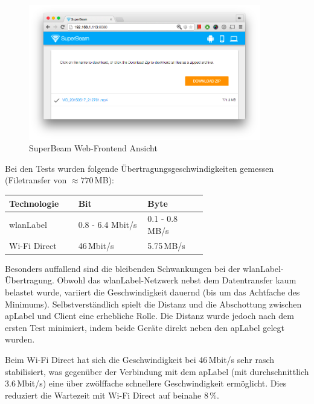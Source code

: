 \begin{figure}[H]
	\centering
	\includegraphics[width=0.9\textwidth]{images/alternatives/superbeam_web.png}
	\caption{SuperBeam Web-Frontend Ansicht}
\end{figure}

Bei den Tests wurden folgende Übertragungsgeschwindigkeiten gemessen (Filetransfer von $\approx770$\,MB):
\begin{table}[H]
	\small\sffamily\renewcommand{\arraystretch}{1.4}
	\begin{tabular}{lp{0.35\linewidth}p{0.30\linewidth}}
		\toprule
		Technologie & Bit & Byte\\
		\midrule
		\gls{wlanLabel} & 0.8 - 6.4 Mbit/s & 0.1 - 0.8\,MB/s\\
		Wi-Fi Direct & 46\,Mbit/s & 5.75\,MB/s\\
		\bottomrule
	\end{tabular}
\end{table}

Besonders auffallend sind die bleibenden Schwankungen bei der \gls{wlanLabel}-Übertragung.
Obwohl das \gls{wlanLabel}-Netzwerk nebst dem Datentransfer kaum belastet wurde, variiert die Geschwindigkeit dauernd (bis um das Achtfache des Minimums).
Selbstverständlich spielt die Distanz und die Abschottung zwischen \gls{apLabel} und Client eine erhebliche Rolle.
Die Distanz wurde jedoch nach dem ersten Test minimiert, indem beide Geräte direkt neben den \gls{apLabel} gelegt wurden.

Beim Wi-Fi Direct hat sich die Geschwindigkeit bei 46\,Mbit/s sehr rasch stabilisiert, was gegenüber der Verbindung mit dem \gls{apLabel} (mit durchschnittlich 3.6\,Mbit/s) eine über zwölffache schnellere Geschwindigkeit ermöglicht.
Dies reduziert die Wartezeit mit Wi-Fi Direct auf beinahe 8\,\%.

